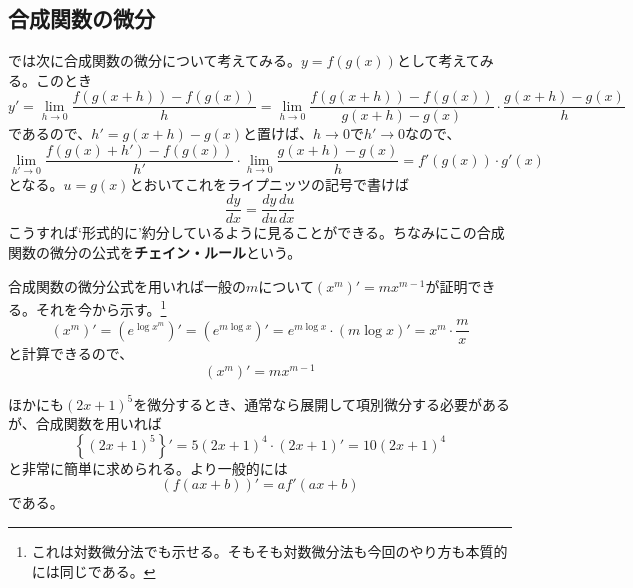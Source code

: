 \documentclass[a4j,dvipdfmx]{jsarticle}
\begin{document}
            \subsection{合成関数の微分}
                では次に合成関数の微分について考えてみる。$y=f(g(x))$として考えてみる。このとき
                \begin{equation}
                    y'=\lim_{h\to 0}\frac{f(g(x+h))-f(g(x))}{h}=\lim_{h\to 0}\frac{f(g(x+h))-f(g(x))}{g(x+h)-g(x)}\cdot \frac{g(x+h)-g(x)}{h}
                \end{equation}
                であるので、$h'=g(x+h)-g(x)$と置けば、$h\to 0$で$h'\to0$なので、
                \begin{equation}
                    \lim_{h'\to 0}\frac{f(g(x)+h')-f(g(x))}{h'}\cdot \lim_{h\to 0}\frac{g(x+h)-g(x)}{h}=f'(g(x))\cdot g'(x)
                \end{equation}
                となる。$u=g(x)$とおいてこれをライプニッツの記号で書けば
                \begin{equation}
                    \frac{dy}{dx}=\frac{dy}{du}\frac{du}{dx}\label{eq:合成関数の微分}
                \end{equation}
                こうすれば`形式的に'約分しているように見ることができる。ちなみにこの合成関数の微分の公式を\textbf{チェイン・ルール}という。
                
                合成関数の微分公式を用いれば一般の$m$について$(x^m)'=mx^{m-1}$が証明できる。それを今から示す。\footnote{これは対数微分法でも示せる。そもそも対数微分法も今回のやり方も本質的には同じである。}
                \begin{equation}
                    (x^m)'=(e^{\log x^m})'=(e^{m\log x})'=e^{m\log x}\cdot (m\log x)'=x^{m}\cdot \frac{m}{x}
                \end{equation}
                と計算できるので、
                \begin{equation}
                    (x^m)'=mx^{m-1}
                \end{equation}
                
                ほかにも$(2x+1)^5$を微分するとき、通常なら展開して項別微分する必要があるが、合成関数を用いれば
                \begin{equation}
                    \left\{(2x+1)^5\right\}'=5(2x+1)^4\cdot (2x+1)'=10(2x+1)^4
                \end{equation}
                と非常に簡単に求められる。より一般的には
                \begin{equation}
                    (f(ax+b))'=af'(ax+b)
                \end{equation}
                である。
            \clearpage
\end{document}
